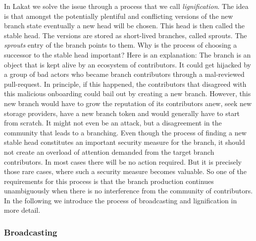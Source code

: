 In Lakat we solve the issue through a process that we call \textit{lignification}. The idea is that amongst the potentially plentiful and conflicting versions of the new branch state eventually a new head will be chosen. This head is then called the stable head. The versions are stored as short-lived branches, called sprouts. The \textit{sprouts} entry of the branch points to them. Why is the process of choosing a successor to the stable head important? Here is an explanation: The branch is an object that is kept alive by an ecosystem of contributors. It could get hijacked by a group of bad actors who became branch contributors through a mal-reviewed pull-request. In principle, if this happened, the contributors that disagreed with this malicious onboarding could bail out by creating a new branch. However, this new branch would have to grow the reputation of its contributors anew, seek new storage providers, have a new branch token and would generally have to start from scratch. It might not even be an attack, but a disagreement in the community that leads to a branching.
Even though the process of finding a new stable head constitutes an important security measure for the branch, it should not create an overload of attention demanded from the target branch contributors. In most cases there will be no action required. But it is precisely those rare cases, where such a security measure becomes valuable. So one of the requirements for this process is that the branch production continues unambiguously when there is no interference from the community of contributors. In the following we introduce the process of broadcasting and lignification in more detail.

\subsubsection*{Broadcasting}

